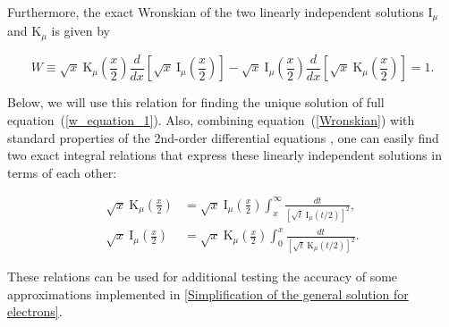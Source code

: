 \documentclass[draft]{agujournal2019}
\begin{document}
Furthermore, the exact Wronskian of the two linearly independent solutions
$\mathrm{I}_{\mu}$ and $\mathrm{K}_{\mu}$ is given by
\begin{linenomath*}
\begin{equation}
W\equiv\sqrt{x}\ \mathrm{K}_{\mu}\left(  \frac{x}{2}\right)  \frac{d}{dx}\left[
\sqrt{x}\ \mathrm{I}_{\mu}\left(  \frac{x}{2}\right)  \right]  -\sqrt
{x}\ \mathrm{I}_{\mu}\left(  \frac{x}{2}\right)  \frac{d}{dx}\left[  \sqrt
{x}\ \mathrm{K}_{\mu}\left(  \frac{x}{2}\right)  \right]  =1.
\label{Wronskian}
\end{equation}
\end{linenomath*}
Below, we will use this relation for finding the unique solution of full
equation~(\ref{w_equation_1}). Also, combining equation~(\ref{Wronskian}) with
standard properties of the 2nd-order differential equations
\cite{Abramowitz:Handbook88,Arfken:Mathematical}, one can easily find two
exact integral relations that express these linearly independent solutions in terms of each other:
\begin{linenomath*}
\begin{subequations}
\label{Bessel_I,K_via_K,I}
\begin{align}
\sqrt{x}\ \mathrm{K}_{\mu}\left(  \frac{x}{2}\right)   &  =\sqrt
{x}\ \mathrm{I}_{\mu}\left(  \frac{x}{2}\right)  \int_{x}^{\infty}\frac
{dt}{\left[  \sqrt{t}\ \mathrm{I}_{\mu}\left(  t/2\right)  \right]  ^{2}%
},\label{Bessel_K_via_I}\\
\sqrt{x}\ \mathrm{I}_{\mu}\left(  \frac{x}{2}\right)   &  =\sqrt
{x}\ \mathrm{K}_{\mu}\left(  \frac{x}{2}\right)  \int_{0}^{x}\frac{dt}{\left[
\sqrt{t}\ \mathrm{K}_{\mu}\left(  t/2\right)  \right]  ^{2}}\!.
\label{Bessel_I_via_K}
\end{align}
\end{subequations}
\end{linenomath*}
These relations can be used for additional testing the accuracy of 
some approximations implemented in \ref{Simplification of the general solution for electrons}.
\end{document}
